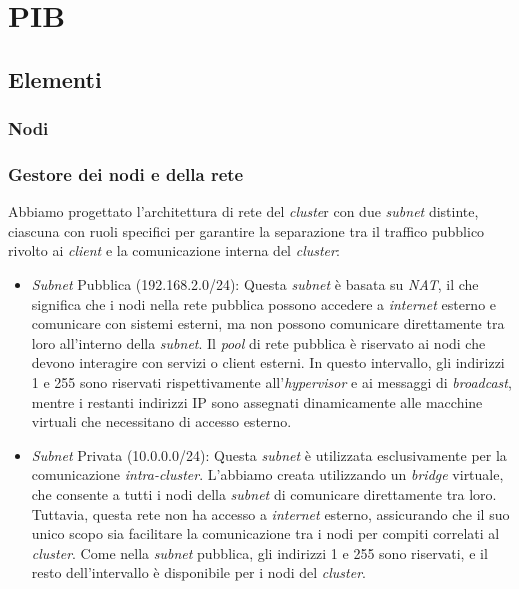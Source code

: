 
\section{PIB}
\subsection{Elementi}
\subsubsection{Nodi}

\subsubsection{Gestore dei nodi e della rete}
Abbiamo progettato l'architettura di rete del \textit{cluste}r con due \textit{subnet} distinte, ciascuna con ruoli specifici per garantire la separazione tra il traffico pubblico rivolto ai \textit{client} e la comunicazione interna del \textit{cluster}:
\begin{itemize}
  \item \textit{Subnet} Pubblica (192.168.2.0/24): Questa \textit{subnet} è basata su \textit{NAT}, il che significa che i nodi nella rete pubblica possono accedere a \textit{internet} esterno e comunicare con sistemi esterni, 
    ma non possono comunicare direttamente tra loro all'interno della \textit{subnet}. Il \textit{pool} di rete pubblica è riservato ai nodi che devono interagire con servizi o client esterni. In questo intervallo, 
    gli indirizzi 1 e 255 sono riservati rispettivamente all'\textit{hypervisor} e ai messaggi di \textit{broadcast}, mentre i restanti indirizzi IP sono assegnati dinamicamente alle macchine virtuali che necessitano di 
    accesso esterno.
  \item \textit{Subnet} Privata (10.0.0.0/24): Questa \textit{subnet} è utilizzata esclusivamente per la comunicazione \textit{intra-cluster}. L'abbiamo creata utilizzando un \textit{bridge} virtuale, che consente a tutti i 
    nodi della \textit{subnet} di comunicare direttamente tra loro. Tuttavia, questa rete non ha accesso a \textit{internet} esterno, assicurando che il suo unico scopo sia facilitare la comunicazione tra i nodi per compiti 
    correlati al \textit{cluster}. Come nella \textit{subnet} pubblica, gli indirizzi 1 e 255 sono riservati, e il resto dell'intervallo è disponibile per i nodi del \textit{cluster}.
\end{itemize}

